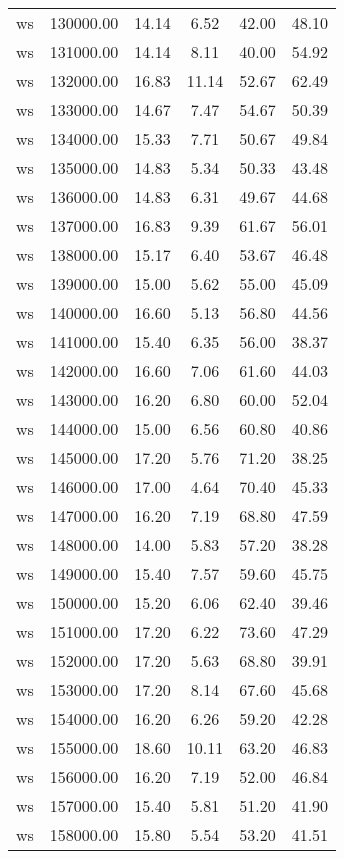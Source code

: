 \begin{table}[ht]
\begin{table}[ht]
\begin{tabular}{|cccccc}
  ws & 130000.00 & 14.14 & 6.52 & 42.00 & 48.10 \\ 
  ws & 131000.00 & 14.14 & 8.11 & 40.00 & 54.92 \\ 
  ws & 132000.00 & 16.83 & 11.14 & 52.67 & 62.49 \\ 
  ws & 133000.00 & 14.67 & 7.47 & 54.67 & 50.39 \\ 
  ws & 134000.00 & 15.33 & 7.71 & 50.67 & 49.84 \\ 
  ws & 135000.00 & 14.83 & 5.34 & 50.33 & 43.48 \\ 
  ws & 136000.00 & 14.83 & 6.31 & 49.67 & 44.68 \\ 
  ws & 137000.00 & 16.83 & 9.39 & 61.67 & 56.01 \\ 
  ws & 138000.00 & 15.17 & 6.40 & 53.67 & 46.48 \\ 
  ws & 139000.00 & 15.00 & 5.62 & 55.00 & 45.09 \\ 
  ws & 140000.00 & 16.60 & 5.13 & 56.80 & 44.56 \\ 
  ws & 141000.00 & 15.40 & 6.35 & 56.00 & 38.37 \\ 
  ws & 142000.00 & 16.60 & 7.06 & 61.60 & 44.03 \\ 
  ws & 143000.00 & 16.20 & 6.80 & 60.00 & 52.04 \\ 
  ws & 144000.00 & 15.00 & 6.56 & 60.80 & 40.86 \\ 
  ws & 145000.00 & 17.20 & 5.76 & 71.20 & 38.25 \\ 
  ws & 146000.00 & 17.00 & 4.64 & 70.40 & 45.33 \\ 
  ws & 147000.00 & 16.20 & 7.19 & 68.80 & 47.59 \\ 
  ws & 148000.00 & 14.00 & 5.83 & 57.20 & 38.28 \\ 
  ws & 149000.00 & 15.40 & 7.57 & 59.60 & 45.75 \\ 
  ws & 150000.00 & 15.20 & 6.06 & 62.40 & 39.46 \\ 
  ws & 151000.00 & 17.20 & 6.22 & 73.60 & 47.29 \\ 
  ws & 152000.00 & 17.20 & 5.63 & 68.80 & 39.91 \\ 
  ws & 153000.00 & 17.20 & 8.14 & 67.60 & 45.68 \\ 
  ws & 154000.00 & 16.20 & 6.26 & 59.20 & 42.28 \\ 
  ws & 155000.00 & 18.60 & 10.11 & 63.20 & 46.83 \\ 
  ws & 156000.00 & 16.20 & 7.19 & 52.00 & 46.84 \\ 
  ws & 157000.00 & 15.40 & 5.81 & 51.20 & 41.90 \\ 
  ws & 158000.00 & 15.80 & 5.54 & 53.20 & 41.51 \\ 

\end{tabular}
\end{table}
\end{table}
